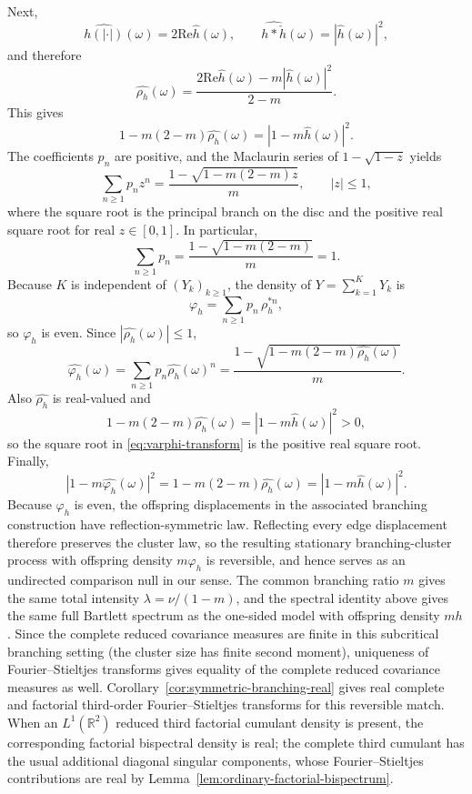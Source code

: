 \documentclass[aap,press]{apt} \volno{00} \partno{00}
\newcommand{\R}{\mathbb{R}}
\newcommand{\1}{\mathbf{1}}
\newcommand{\Ree}{\mathrm{Re}}
\numberwithin{equation}{section}
\begin{document}
Next,
\[
\widehat{h(|\cdot|)}(\omega)=2\Ree \widehat h(\omega),\qquad
\widehat{h*\check h}(\omega)=|\widehat h(\omega)|^2,
\]
and therefore
\[
\widehat{\rho_h}(\omega)
=
\frac{2\Ree\widehat h(\omega)-m|\widehat h(\omega)|^2}{2-m}.
\]
This gives
\[
1-m(2-m)\widehat{\rho_h}(\omega)=|1-m\widehat h(\omega)|^2.
\]
The coefficients $p_n$ are positive, and the Maclaurin series of $1-\sqrt{1-z}$ yields
\[
\sum_{n\ge1}p_n z^n=\frac{1-\sqrt{1-m(2-m)z}}{m},\qquad |z|\le1,
\]
where the square root is the principal branch on the disc and the positive real square root for real $z\in[0,1]$. In particular,
\[
\sum_{n\ge1}p_n=\frac{1-\sqrt{1-m(2-m)}}{m}=1.
\]
Because $K$ is independent of $(Y_k)_{k\ge1}$, the density of $Y=\sum_{k=1}^K Y_k$ is
\[
\varphi_h=\sum_{n\ge1}p_n\,\rho_h^{*n},
\]
so $\varphi_h$ is even. Since $|\widehat{\rho_h}(\omega)|\le1$,
\[
\widehat{\varphi_h}(\omega)=\sum_{n\ge1}p_n\widehat{\rho_h}(\omega)^n
=\frac{1-\sqrt{1-m(2-m)\widehat{\rho_h}(\omega)}}{m}.
\]
Also $\widehat{\rho_h}$ is real-valued and
\[
1-m(2-m)\widehat{\rho_h}(\omega)=|1-m\widehat h(\omega)|^2>0,
\]
so the square root in \eqref{eq:varphi-transform} is the positive real square root. Finally,
\[
|1-m\widehat{\varphi_h}(\omega)|^2
=
1-m(2-m)\widehat{\rho_h}(\omega)
=
|1-m\widehat h(\omega)|^2.
\]
Because $\varphi_h$ is even, the offspring displacements in the associated branching construction have reflection-symmetric law. Reflecting every edge displacement therefore preserves the cluster law, so the resulting stationary branching-cluster process with offspring density $m\varphi_h$ is reversible, and hence serves as an undirected comparison null in our sense. The common branching ratio $m$ gives the same total intensity $\lambda=\nu/(1-m)$, and the spectral identity above gives the same full Bartlett spectrum as the one-sided model with offspring density $mh$. Since the complete reduced covariance measures are finite in this subcritical branching setting (the cluster size has finite second moment), uniqueness of Fourier--Stieltjes transforms gives equality of the complete reduced covariance measures as well. Corollary~\ref{cor:symmetric-branching-real} gives real complete and factorial third-order Fourier--Stieltjes transforms for this reversible match. When an $L^1(\R^2)$ reduced third factorial cumulant density is present, the corresponding factorial bispectral density is real; the complete third cumulant has the usual additional diagonal singular components, whose Fourier--Stieltjes contributions are real by Lemma~\ref{lem:ordinary-factorial-bispectrum}.
\end{document}
